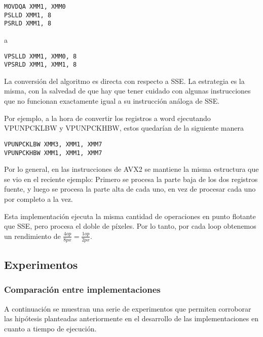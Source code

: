 \begin{lstlisting}
MOVDQA XMM1, XMM0
PSLLD XMM1, 8
PSRLD XMM1, 8
\end{lstlisting}

a

\begin{lstlisting}
VPSLLD XMM1, XMM0, 8
VPSRLD XMM1, XMM1, 8
\end{lstlisting}


La conversión del algoritmo es directa con respecto a SSE. La estrategia es la misma, con la salvedad de que hay que tener cuidado con algunas instrucciones que no funcionan exactamente igual a su instrucción análoga de SSE.

Por ejemplo, a la hora de convertir los registros a word ejecutando VPUNPCKLBW y VPUNPCKHBW, estos quedarían de la siguiente manera

\begin{lstlisting}
VPUNPCKLBW XMM3, XMM1, XMM7
VPUNPCKHBW XMM1, XMM1, XMM7
\end{lstlisting}

 

 

Por lo general, en las instrucciones de AVX2 se mantiene la misma estructura que se vio en el reciente ejemplo: Primero se procesa la parte baja de los dos registros fuente, y luego se procesa la parte alta de cada uno, en vez de procesar cada uno por completo a la vez.

Esta implementación ejecuta la misma cantidad de operaciones en punto flotante que SSE, pero procesa el doble de píxeles. Por lo tanto, por cada loop obtenemos un rendimiento de $\frac{4op}{8px} = \frac{1op}{2px}$.


\subsection{Experimentos}

\subsubsection{Comparación entre implementaciones}

A continuación se muestran una serie de experimentos que permiten corroborar las hipótesis planteadas anteriormente en el desarrollo de las implementaciones en cuanto a tiempo de ejecución.

